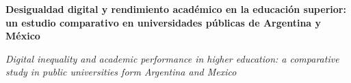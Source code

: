 \documentclass{article}
\renewcommand{\normalsize}{\fontsize{10pt}{13pt}\selectfont}
\newcommand{\articulotipo}{}
\newcommand{\articulotitulo}{}
\newcommand{\articulotitulotrans}{}
\newcommand{\articuloautores}{}
\newcommand{\articulodoi}{}
\newcommand{\articuloidiomaxml}{es}
\newcommand{\articulorevista}{}
\newcommand{\articuloissne}{}
\newcommand{\articulovolumen}{}
\newcommand{\articulonumero}{}
\newcommand{\articulofecha}{}
\newcommand{\articulopagina}{0}
\begin{document}

\renewcommand{\articuloidiomaxml}{es}
\renewcommand{\articulotitulo}{Desigualdad digital y rendimiento académico en la educación superior: un estudio comparativo en universidades públicas de Argentina y México}
\renewcommand{\articuloautores}{Persona Una}
\renewcommand{\articulodoi}{10.24215/18522971e134}
\renewcommand{\articulotipo}{ARTÍCULO DE INVESTIGACIÓN}
\renewcommand{\articulorevista}{Revista Revistas}
\renewcommand{\articuloissne}{1515-1573}
\renewcommand{\articulovolumen}{1}
\renewcommand{\articulonumero}{1}
\renewcommand{\articulofecha}{ 2026}
\renewcommand{\articulopagina}{0}

\setcounter{page}{0}
\thispagestyle{firstpage}

\noindent\begin{minipage}[t]{\dimexpr\textwidth+\marginparsep+\marginparwidth\relax}%
{\sffamily\bfseries\Large\articulotitulo\par}%
\end{minipage}\par
\vspace{3mm}%
\renewcommand{\articulotitulotrans}{Digital inequality and academic performance in higher education: a comparative study in public universities form Argentina and Mexico}
\noindent\begin{minipage}[t]{\dimexpr\textwidth+\marginparsep+\marginparwidth\relax}%
{\sffamily\itshape\normalsize\articulotitulotrans\par}%
\end{minipage}\par
\vspace{4mm}%
\end{document}

